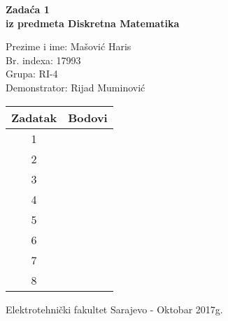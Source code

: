 \documentclass[12pt]{article}
\newcommand{\prezimeIme}{Mašović Haris}
\newcommand{\brIndexa}{17993}
\newcommand{\brZadace}{1}
\begin{document}
    
    \thispagestyle{empty}
    \begin{center}
      \vspace*{1cm}

      \vspace*{2cm}
      {\huge \bf Zadaća \brZadace } \\
      \vspace*{1cm}
      {\Large \bf iz predmeta Diskretna Matematika }

      \vspace*{2cm}

      {\Large Prezime i ime: \prezimeIme} \\
      \vspace*{0.75cm}
      {\Large Br. indexa: \brIndexa} \\
      \vspace*{0.75cm}
      {\Large Grupa: RI-4} \\
      \vspace*{0.75cm}
      {\Large Demonstrator: Rijad Muminović} \\
      \vspace*{2cm}
      
      \renewcommand{\arraystretch}{1.75}
      \begin{tabular}{|c|c|}
    	\hline Zadatak & Bodovi \\
    	\hline 1 &  \\
    	\hline 2 &  \\
    	\hline 3 &  \\
    	\hline 4 &  \\
    	\hline 5 &  \\
    	\hline 6 &  \\
    	\hline 7 &  \\
    	\hline 8 &  \\
    	\hline
     \end{tabular}

      \vfill


      {\large Elektrotehnički fakultet Sarajevo - Oktobar 2017g.}

    \end{center}
    \newpage
    \thispagestyle{empty}
    
\end{document}
